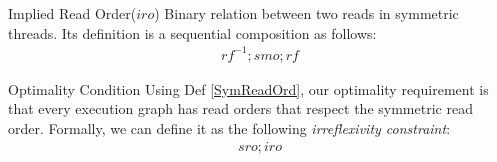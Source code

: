         \begin{definition}{Implied Read Order($iro$)}
            \label{ImpReadOrd}
            Binary relation between two reads in symmetric threads. 
            Its definition is a sequential composition as follows:
            \begin{align*}
                rf^{-1};smo;rf
            \end{align*} 

        \end{definition}

        \begin{definition}{Optimality Condition}
            \label{opt_cond}
            Using Def \ref{SymReadOrd}, our optimality requirement is that every execution graph has read orders that respect the symmetric read order.
            Formally, we can define it as the following \textit{irreflexivity constraint}:
            \begin{align*}
                sro;iro
            \end{align*}

        \end{definition}

